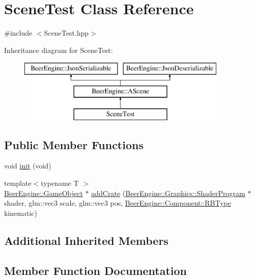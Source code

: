 \hypertarget{class_scene_test}{}\section{Scene\+Test Class Reference}
\label{class_scene_test}


{\ttfamily \#include $<$Scene\+Test.\+hpp$>$}

Inheritance diagram for Scene\+Test\+:\begin{figure}[H]
\begin{center}
\leavevmode
\includegraphics[height=3.000000cm]{class_scene_test}
\end{center}
\end{figure}
\subsection*{Public Member Functions}
\begin{DoxyCompactItemize}
\item 
void \mbox{\hyperlink{class_scene_test_aedded03410798c3705fb3fb028e56ab5}{init}} (void)
\item 
{\footnotesize template$<$typename T $>$ }\\\mbox{\hyperlink{class_beer_engine_1_1_game_object}{Beer\+Engine\+::\+Game\+Object}} $\ast$ \mbox{\hyperlink{class_scene_test_a29d4ffbd6a5035a4d62e9e59b311f791}{add\+Crate}} (\mbox{\hyperlink{class_beer_engine_1_1_graphics_1_1_shader_program}{Beer\+Engine\+::\+Graphics\+::\+Shader\+Program}} $\ast$shader, glm\+::vec3 scale, glm\+::vec3 pos, \mbox{\hyperlink{namespace_beer_engine_1_1_component_a2cfe279cc309b6420e792597940b8a33}{Beer\+Engine\+::\+Component\+::\+R\+B\+Type}} kinematic)
\end{DoxyCompactItemize}
\subsection*{Additional Inherited Members}


\subsection{Member Function Documentation}
\mbox{\label{class_scene_test_a29d4ffbd6a5035a4d62e9e59b311f791}} 
